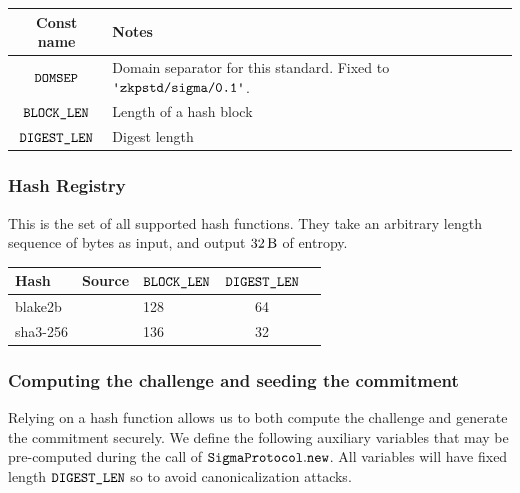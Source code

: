 \documentclass[11pt]{article}
\begin{document}
\begin{center}
\begin{tabular}{cl}
  Const name & Notes \\
  \hline
  $\texttt{DOMSEP}$ & Domain separator for this standard. Fixed to $\domsepctx$.   \\
  $\texttt{BLOCK\_LEN}$ & Length of a hash block \\
  $\texttt{DIGEST\_LEN}$ & Digest length
\end{tabular}
\end{center}

\subsubsection{Hash Registry}
\label{sec:hash-registry}

This is the set of all supported hash functions. They take an arbitrary length sequence of bytes as input, and output $\seedlen$ of entropy.

\begin{center}
  \begin{tabular}{lllcc}
  Hash  & Source & $\texttt{BLOCK\_LEN}$ & $\texttt{DIGEST\_LEN}$ \\
  \hline
  blake2b &  \cite{ACNS:ANWW13} & 128 & 64 \\
  sha3-256 & \cite{EC:BDPA13} & 136 & 32 \\
  \end{tabular}
\end{center}
\subsubsection{Computing the challenge and seeding the commitment}
\label{sec:fs-challenge}

Relying on a hash function allows us to both compute the challenge and generate the commitment securely.
We define the following auxiliary variables that may be pre-computed during the call of $\texttt{SigmaProtocol}.\texttt{new}$. All variables will have fixed length $\texttt{DIGEST\_LEN}$ so to avoid
canonicalization attacks.
\end{document}

